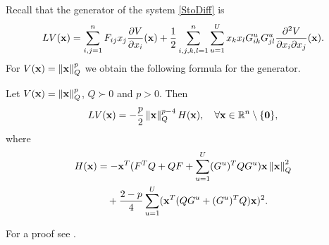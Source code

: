 \documentclass[a4paper,12pt,twoside,BCOR=10mm]{scrbook}
\begin{document}
Recall that the generator of the system \eqref{StoDiff} is
\begin{align}\label{ConstantLVGenerator}
    LV(\mathbf{x}) = \sum\limits_{i,j = 1}^nF_{ij}x_j\frac{\partial V}{\partial x_i}(\mathbf{x}) + \frac{1}{2}\sum\limits_{i,j,k,l = 1}^n\sum\limits_{u = 1}^Ux_k x_l G_{ik}^u G_{jl}^u \frac{\partial^2 V}{\partial x_i \partial x_j}(\mathbf{x}).
\end{align}
For $V(\mathbf{x}) = \left\lVert\mathbf{x}\right\rVert_Q^p$ we obtain the following formula for the generator.
\begin{lemma}\label{LemmaLVShorthand}
Let $V(\mathbf{x}) = \left\lVert\mathbf{x}\right\rVert_Q^p$, $Q \succ 0$ and $p > 0$. Then
\begin{align}\label{LV equation}
    LV(\mathbf{x}) = -\frac{p}{2}\left\lVert\mathbf{x}\right\rVert_{Q}^{p - 4}H(\mathbf{x}), \quad \forall \mathbf{x} \in\mathbb{R}^{n}\setminus \{\mathbf{0}\},
\end{align}
where
\begin{align}\label{H(x) definition}
\begin{split}
    H(\mathbf{x}) &= -\mathbf{x}^T (F^T Q + QF + \sum_{u = 1}^U (G^u)^TQG^u) \mathbf{x}\left\lVert\mathbf{x}\right\rVert_{Q}^{2}\\
    &\quad+ \frac{2 - p}{4} \sum_{u = 1}^U (\mathbf{x}^T (QG^u + (G^u)^TQ)\mathbf{x})^2.
\end{split}
\end{align}
\end{lemma}
For a proof see \citep[Lemma 12]{HGGS2018localLya}.
\end{document}
